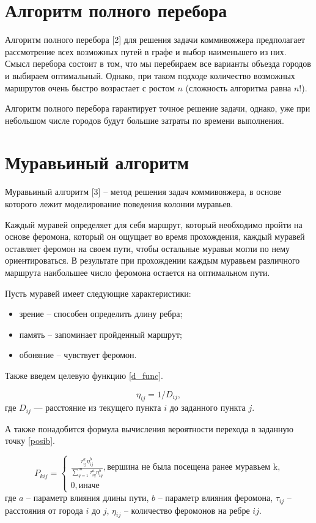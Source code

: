 \documentclass[a4paper,14pt, unknownkeysallowed]{extreport}
\begin{document}
\section{Алгоритм полного перебора}


Алгоритм полного перебора [2] для решения задачи коммивояжера предполагает рассмотрение всех возможных путей в графе и выбор наименьшего из них. Смысл перебора состоит в том, что мы перебираем все варианты объезда городов и выбираем оптимальный. Однако, при таком подходе количество возможных маршрутов очень быстро возрастает с ростом $n$ (сложность алгоритма равна $n!$).

Алгоритм полного перебора гарантирует точное решение задачи, однако, уже при небольшом числе городов будут большие затраты по времени выполнения.

\section{Муравьиный алгоритм}


Муравьиный алгоритм [3] -- метод решения задач коммивояжера, в основе которого лежит моделирование поведения колонии муравьев.

Каждый муравей определяет для себя маршрут, который необходимо пройти на основе феромона, который он ощущает во время прохождения, каждый муравей оставляет феромон на своем пути, чтобы остальные муравьи могли по нему ориентироваться. В результате при прохождении каждым муравьем различного маршрута наибольшее число феромона остается на оптимальном пути.


Пусть муравей имеет следующие характеристики:
\begin{itemize}
	\item зрение -- способен определить длину ребра;
	\item память -- запоминает пройденный маршрут;
	\item обоняние -- чувствует феромон.
\end{itemize}


Также введем целевую функцию \eqref{d_func}.

\begin{equation}
	\label{d_func}
	\eta_{ij} = 1 / D_{ij},
\end{equation}
где $D_{ij}$ — расстояние из текущего пункта $i$ до заданного пункта $j$.


А также понадобится формула вычисления вероятности перехода в заданную точку \eqref{posib}.

\begin{equation}
	\label{posib}
	P_{kij} = \begin{cases}
		\frac{\tau_{ij}^a\eta_{ij}^b}{\sum_{q=1}^m \tau^a_{iq}\eta^b_{iq}}, \textrm{вершина не была посещена ранее муравьем k,} \\
		0, \textrm{иначе}
	\end{cases}
\end{equation}
где $a$ -- параметр влияния длины пути, $b$ -- параметр влияния феромона, $\tau_{ij}$ -- расстояния от города $i$ до $j$, $\eta_{ij}$ -- количество феромонов на ребре $ij$.
\end{document}
